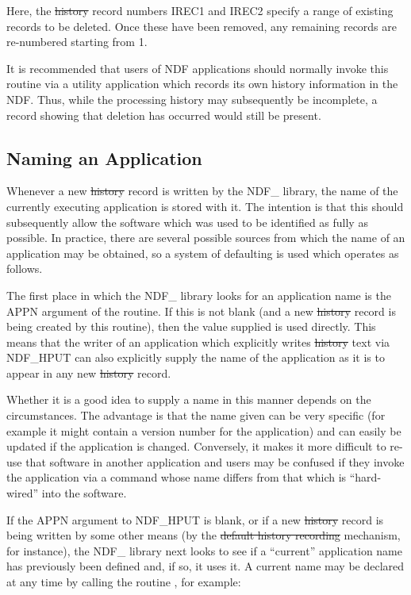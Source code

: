 Here, the \st{history\/} record numbers IREC1 and IREC2 specify a range of
existing records to be deleted. Once these have been removed, any
remaining records are re-numbered starting from 1.

It is recommended that users of NDF applications should normally
invoke this routine via a utility application which records its own
history information in the NDF. Thus, while the processing history may
subsequently be incomplete, a record showing that deletion has
occurred would still be present.

\subsection{\label{ss:naminghistoryapp}Naming an Application}

Whenever a new \st{history\/} record is written by the NDF\_ library, the
name of the currently executing application is stored with it. The
intention is that this should subsequently allow the software which
was used to be identified as fully as possible. In practice, there are
several possible sources from which the name of an application may be
obtained, so a system of defaulting is used which operates as follows.

The first place in which the NDF\_ library looks for an application
name is the APPN argument of the  routine. If this is not
blank (and a new \st{history\/} record is being created by this routine),
then the value supplied is used directly. This means that the writer
of an application which explicitly writes \st{history\/} text via NDF\_HPUT
can also explicitly supply the name of the application as it is to
appear in any new \st{history\/} record.

Whether it is a good idea to supply a name in this manner depends on
the circumstances. The advantage is that the name given can be very
specific (for example it might contain a version number for the
application) and can easily be updated if the application is changed.
Conversely, it makes it more difficult to re-use that software in
another application and users may be confused if they invoke the
application via a command whose name differs from that which is
``hard-wired'' into the software.

If the APPN argument to NDF\_HPUT is blank, or if a new \st{history\/} record
is being written by some other means (by the \st{default history recording\/}
mechanism, for instance), the NDF\_ library next looks to see if a
``current'' application name has previously been defined and, if so, it
uses it. A current name may be declared at any time by calling the
routine , for example:

